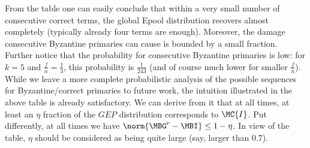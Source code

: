 From the table one can easily conclude that within a very small number of consecutive correct terms, the global Epool distribution recovers almost completely (typically already four terms are enough). Moreover, the damage consecutive Byzantine primaries can cause is bounded by a small fraction. Further notice that the probability for consecutive Byzantine primaries is low: for $k=5$ and $\frac{f}{n}=\frac{1}{3}$, this probability is $\frac{1}{243}$ (and of course much lower for smaller $\frac{f}{n}$). While we leave a more complete probabilistic analysis of the possible sequences for Byzantine/correct primaries to future work, the intuition illustrated in the above table is already satisfactory. We can derive from it that at all times, at least an $\eta$ fraction of the $GEP$ distribution corresponds to $\MC{I}$. Put differently, at all times we have $\norm{\MBG^r-\MBI}\leq 1-\eta$. In view of the table, $\eta$ should be considered as being quite large (say, larger than $0.7$).

%

